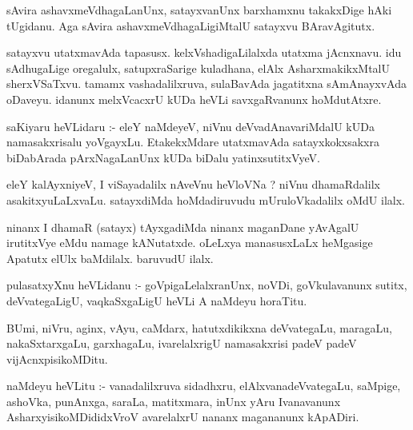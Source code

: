 \documentclass{article}
\begin{document}
\begin{mn}
sAvira  ashavxmeVdhagaLanUnx,  satayxvanUnx  barxhamxnu  takakxDige  hAki tUgidanu.  
Aga  sAvira  ashavxmeVdhagaLigiMtalU  satayxvu  BAravAgitutx.
\end{mn}

\begin{mn}
satayxvu  utatxmavAda  tapasusx.  kelxVshadigaLilalxda  utatxma  jAcnxnavu.  idu  
sAdhugaLige  oregalulx,  satupxraSarige  kuladhana,  elAlx  AsharxmakikxMtalU  
sherxVSaTxvu.  tamamx  vashadalilxruva,  sulaBavAda  jagatitxna  sAmAnayxvAda  
oDaveyu.  idanunx  melxVcacxrU  kUDa  heVLi  savxgaRvanunx  hoMdutAtxre.
\end{mn}

\begin{mn}
saKiyaru  heVLidaru :-  eleY  naMdeyeV,  niVnu  deVvadAnavariMdalU  kUDa  namasakxrisalu  yoVgayxLu.  
EtakekxMdare  utatxmavAda  satayxkokxsakxra  biDabArada  pArxNagaLanUnx  kUDa  biDalu  yatinxsutitxVyeV.
\end{mn}

\begin{mn}
eleY  kalAyxniyeV,  I  viSayadalilx  nAveVnu  heVloVNa ?  niVnu  dhamaRdalilx  
asakitxyuLaLxvaLu.  satayxdiMda  hoMdadiruvudu  mUruloVkadalilx  oMdU  ilalx.
\end{mn}

\begin{mn}
ninanx  I  dhamaR (satayx) tAyxgadiMda  ninanx  maganDane  yAvAgalU  irutitxVye  eMdu  namage  
kANutatxde.  oLeLxya  manasusxLaLx  heMgasige  Apatutx  elUlx  baMdilalx.  baruvudU  ilalx.
\end{mn}

\begin{mn}
pulasatxyXnu  heVLidanu :-  goVpigaLelalxranUnx,  noVDi,  goVkulavanunx  sutitx,  
deVvategaLigU,  vaqkaSxgaLigU  heVLi  A  naMdeyu  horaTitu.
\end{mn}

\begin{mn}
BUmi,  niVru,  aginx, vAyu,  caMdarx,  hatutxdikikxna  deVvategaLu,  maragaLu,  nakaSxtarxgaLu,  
garxhagaLu,  ivarelalxrigU  namasakxrisi  padeV padeV  vijAcnxpisikoMDitu.
\end{mn}

\begin{mn}
naMdeyu  heVLitu :- vanadalilxruva  sidadhxru,  elAlxvanadeVvategaLu,  saMpige,  
ashoVka,  punAnxga,  saraLa,  matitxmara,  inUnx  yAru  Ivanavanunx  
AsharxyisikoMDididxVroV  avarelalxrU  nananx  magananunx  kApADiri.
\end{mn}
\end{document}
